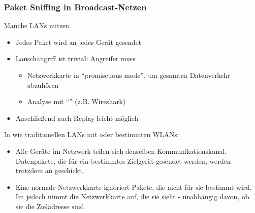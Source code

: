 \subsubsection*{Paket Sniffing in Broadcast-Netzen}
Manche LANs nutzen 
\begin{itemize}
    \item Jedes Paket wird an jedes Gerät gesendet
    \item Lauschangriff ist trivial: Angreifer muss 
    \begin{itemize}
        \item Netzwerkkarte in \enquote{promiscuous mode}, um gesamten Datenverkehr abzuhören
        \item Analyse mit \enquote{} (z.B. Wireshark)
    \end{itemize}
    \item Anschließend auch Replay leicht möglich
\end{itemize}
\begin{infoBox}[title=Warum kann Paket-Sniffing in Broadcast-Netzen auftreten?]
    In  wie traditionellen LANs mit  oder bestimmten WLANs:
    \begin{itemize}
        \item {} Alle Geräte im Netzwerk teilen sich denselben Kommunikationskanal. Datenpakete, die für ein bestimmtes Zielgerät gesendet werden, werden trotzdem an  geschickt.
        \item {} Eine normale Netzwerkkarte ignoriert Pakete, die nicht für sie bestimmt wird. Im  jedoch nimmt die Netzwerkkarte  auf, die sie sieht - unabhängig davon, ob sie die Zieladresse sind.
    \end{itemize}
\end{infoBox}

